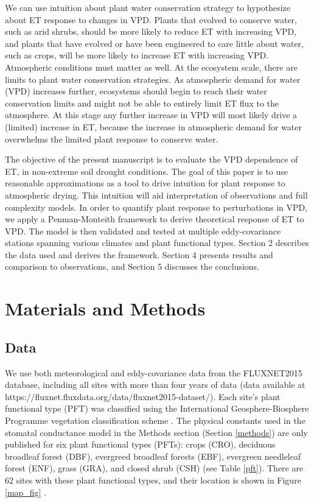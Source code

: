 \documentclass[draft,linenumbers]{gcbjournal}
\begin{document}
We can use intuition about plant water conservation strategy to hypothesize about ET response to changes in VPD. Plants that evolved to conserve water, such as arid shrubs, should be more likely to reduce ET with increasing VPD, and plants that have evolved or have been engineered to care little about water, such as crops, will be more likely to increase ET with increasing VPD. Atmospheric conditions must matter as well. At the ecosystem scale, there are limits to plant water conservation strategies. As atmospheric demand for water (VPD) increases further, ecosystems should begin to reach their water conservation limits and might not be able to entirely limit ET flux to the atmosphere. At this stage any further increase in VPD will most likely drive a (limited) increase in ET, because the increase in atmospheric demand for water overwhelms the limited plant response to conserve water.

The objective of the present manuscript is to evaluate the VPD dependence of ET, in non-extreme soil drought conditions. The goal of this paper is to use reasonable approximations as a tool to drive intuition for plant response to atmospheric drying. This intuition will aid interpretation of observations and full complexity models. In order to quantify plant response to perturbations in VPD, we apply a Penman-Monteith framework to derive theoretical response of ET to VPD. The model is then validated and tested at multiple eddy-covariance stations spanning various climates and plant functional types. Section 2 describes the data used and derives the framework. Section 4 presents results and comparison to observations, and  Section 5 discusses the conclusions. 


\section{Materials and Methods}
\subsection{Data}
\label{data}
We use both meteorological and eddy-covariance data from the FLUXNET2015 database, including all sites with more than four years of data (data available at https://fluxnet.fluxdata.org/data/fluxnet2015-dataset/). Each site's plant functional type (PFT) was classified using the International Geosphere-Biosphere Programme vegetation classification scheme \citep{Loveland_1999}. The physical constants used in the stomatal conductance model in the Methods section (Section \ref{methods}) are only published for six plant functional types (PFTs): crops (CRO), deciduous broadleaf forest (DBF), evergreed broadleaf forests (EBF), evergreen needleleaf forest (ENF), grass (GRA), and closed shrub (CSH) (see Table \ref{pft}). There are 62 sites with these plant functional types, and their location is shown in  Figure \ref{map_fig} .
\end{document}
